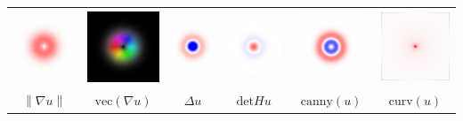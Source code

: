\begin{tabular}{cccccc}
\includegraphics{fgaussgn.png} &
\includegraphics{fgaussg.png} &
\includegraphics{fgaussl.png} &
\includegraphics{fgaussd.png} &
\includegraphics{fgaussc.png} &
\includegraphics{fgaussk.png} \\
$\left\|\nabla u\right\|$ &
$\mathrm{vec}\left(\nabla u\right)$ &
$\Delta u$ &
$\mathrm{det}H u$ &
$\mathrm{canny}(u)$ &
$\mathrm{curv}(u)$
\end{tabular}

